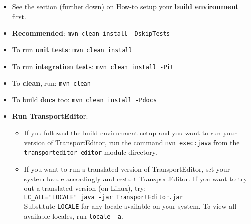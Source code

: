 \begin{itemize}
\item See the section (further down) on How-to setup your \textbf{build environment} first.

\item \textbf{Recommended}: \texttt{mvn clean install -DskipTests}

\item To run \textbf{unit tests}: \texttt{mvn clean install}

\item To run \textbf{integration tests}: \texttt{mvn clean install -Pit}

\item To \textbf{clean}, run: \texttt{mvn clean}

\item To build \textbf{docs} too: \texttt{mvn clean install -Pdocs}

\item \textbf{Run TransportEditor}:
\begin{itemize}
\item If you followed the build environment setup and you want to run your version of TransportEditor,
run the command \texttt{mvn exec:java} from the \texttt{transporteditor-editor} module directory.

\item If you want to run a translated version of TransportEditor, set your system locale accordingly and restart TransportEditor. If you want to try out a translated version (on Linux), try:\\ \verb+LC_ALL="LOCALE" java -jar TransportEditor.jar+\\
Substitute \texttt{LOCALE} for any locale available on your system. To view all available locales,
run \verb+locale -a+.
\end{itemize}
\end{itemize}

